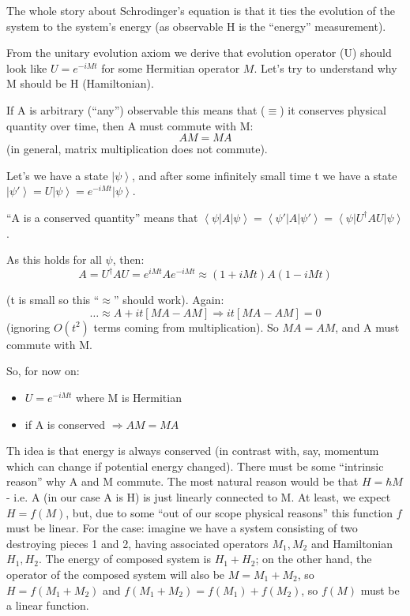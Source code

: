 \documentclass{scrartcl}
\newcommand{\ket}[1]{\left| #1 \right>} %
\newcommand{\bra}[1]{\left< #1 \right|} %
\begin{document}
The whole story about Schrodinger's equation is that it ties the evolution of
the system to the system's energy (as observable H is the ``energy''
measurement).

From the unitary evolution axiom we derive that evolution operator (U) should
look like $U=e^{-iMt}$ for some Hermitian operator $M$. Let's try to understand
why M should be H (Hamiltonian).

If A is arbitrary (``any'') observable this means that ($\equiv$) it conserves
physical quantity over time, then A must commute with M:
$$ A M = M A$$ (in general, matrix multiplication does not commute).

Let's we have a state $\ket\psi$, and after some infinitely small time t we have
a state $\ket{\psi'} = U \ket \psi = e^{-iMt}\ket\psi $.

``A is a conserved quantity'' means that $\bra\psi A \ket\psi = \bra{\psi'} A
\ket{\psi'} = \bra\psi U^\dag A U \ket\psi$.

As this holds for all $\psi$, then:
$$A = U^\dag A U = e^{iMt} A e^{-iMt}\approx (1+iMt) A (1-iMt)$$

(t is small so this ``$\approx$'' should work). Again:
$$ \dots \approx A + it[MA-AM] \Rightarrow it [MA-AM] = 0$$
(ignoring $O(t^2)$ terms coming from multiplication). So $MA = AM$, and A must
commute with M.

So, for now on: \begin{itemize}
\item $U = e^{-iMt}$ where M is Hermitian
\item if A is conserved $\Rightarrow AM = MA$
\end{itemize}
Th idea is that energy is always conserved (in contrast with, say, momentum
which can change if potential energy changed). There must be some ``intrinsic
reason'' why A and M commute.
The most natural reason would be that $H = \hbar M$ - i.e. A (in our case A is
H) is just linearly connected to M. At least, we expect $H = f(M)$, but, due to
some ``out of our scope physical reasons'' this function $f$ must be linear. For
the case: imagine we have a system consisting of two destroying pieces 1 and 2,
having associated operators $M_1, M_2$ and Hamiltonian $H_1, H_2$. The energy of
composed system is $H_1 + H_2$; on the other hand, the operator of the composed
system will also be $M = M_1 + M_2$, so $H = f(M_1 + M_2)$ and $f(M_1 + M_2) =
f(M_1) + f(M_2)$, so $f(M)$ must be a linear function.
\end{document}
